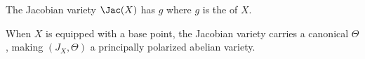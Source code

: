 \begin{definition}
\begin{enumerate}


        The Jacobian variety $\Jac(X)$ has  $g$ where $g$ is the  of $X$.

        When $X$ is equipped with a base point, the Jacobian variety carries a canonical  $\Theta$, making $(J_X, \Theta)$ a principally polarized abelian variety.
    \end{enumerate}

\end{definition}